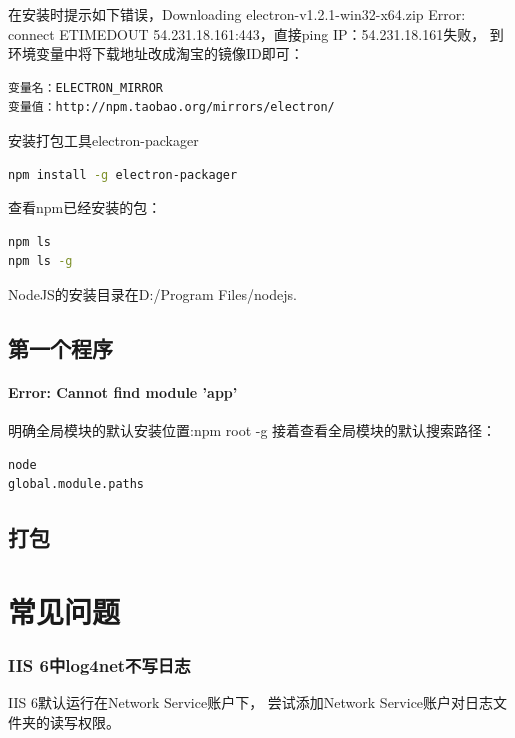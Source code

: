 \documentclass{book}
\begin{document}
在安装时提示如下错误，Downloading electron-v1.2.1-win32-x64.zip
Error: connect ETIMEDOUT 54.231.18.161:443，直接ping IP：54.231.18.161失败，
到环境变量中将下载地址改成淘宝的镜像ID即可：

\begin{lstlisting}
变量名：ELECTRON_MIRROR
变量值：http://npm.taobao.org/mirrors/electron/
\end{lstlisting}

安装打包工具electron-packager

\begin{lstlisting}[language=Bash]
npm install -g electron-packager
\end{lstlisting}

查看npm已经安装的包：

\begin{lstlisting}[language=Bash]
npm ls
npm ls -g
\end{lstlisting}


NodeJS的安装目录在D:/Program Files/nodejs.


\subsection{第一个程序}

\paragraph{Error: Cannot find module 'app'}明确全局模块的默认安装位置:npm root -g
接着查看全局模块的默认搜索路径：

\begin{lstlisting}[language=Bash]
node
global.module.paths
\end{lstlisting}




\subsection{打包}




\section{常见问题}

\subsubsection{IIS 6中log4net不写日志}

IIS 6默认运行在Network Service账户下，
尝试添加Network Service账户对日志文件夹的读写权限。
\end{document}
